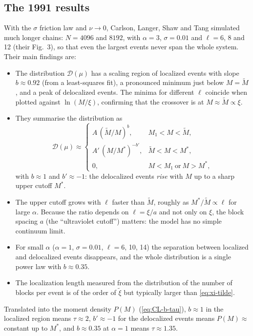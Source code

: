 \subsection{The 1991 results}

With the $\sigma$ friction law and $\nu\to0$, Carlson, Langer, Shaw and Tang simulated much longer chains: $N=4096$ and $8192$, with $\alpha=3$, $\sigma=0.01$ and
$\ell=6$, 8 and 12 (their Fig.~3), so that even the largest events never span the whole system. Their main findings are:
\begin{itemize}
  \item The distribution $\mathcal D(\mu)$ has a scaling region of localized events with slope $b\approx0.92$ (from a least-squares fit), a pronounced minimum
    just below $M=\tilde M$, and a peak of delocalized events. The minima for different $\ell$ coincide when plotted against $\ln(M/\xi)$, confirming that the
    crossover is at $M\approx\tilde M\propto\xi$.
  \item They summarise the distribution as
    \begin{equation}
      \mathcal D(\mu)\approx
      \begin{cases}
        A\,(\tilde M/M)^{b}, & M_1<M<\tilde M,\\
        A'\,(M/M^*)^{-b'}, & \tilde M<M<M^*,\\
        0, & M<M_1\ \text{or}\ M>M^*,
      \end{cases}
      \label{eq:D91}
    \end{equation}
    with $b\approx1$ and $b'\approx-1$: the delocalized events \emph{rise} with $M$ up to a sharp upper cutoff $M^*$.
  \item The upper cutoff grows with $\ell$ faster than $\tilde M$, roughly as $M^*/\tilde M\propto\ell$ for large $\alpha$. Because the ratio depends on
    $\ell=\xi/a$ and not only on $\xi$, the block spacing $a$ (the ``ultraviolet cutoff'') matters: the model has no simple continuum limit.
  \item For small $\alpha$ ($\alpha=1$, $\sigma=0.01$, $\ell=6$, 10, 14) the separation between localized and delocalized events disappears, and the whole
    distribution is a single power law with $b\approx0.35$.
  \item The localization length measured from the distribution of the number of blocks per event is of the order of $\tilde\xi$ but typically larger than
    \cref{eq:xi-tilde}.
\end{itemize}
Translated into the moment density $P(M)$ (\cref{eq:CL-b-tau}), $b\approx1$ in the localized region means $\tau\approx2$, $b'\approx-1$ for the delocalized events
means $P(M)\approx$ constant up to $M^*$, and $b\approx0.35$ at $\alpha=1$ means $\tau\approx1.35$.

